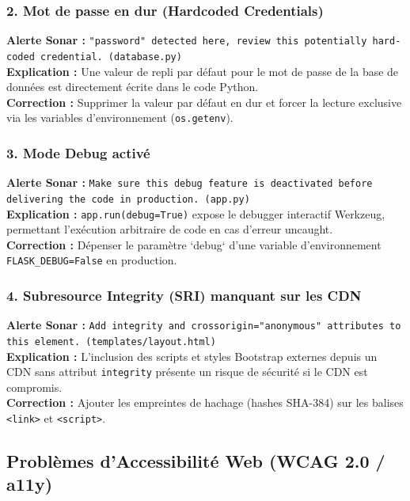 \documentclass[12pt,a4paper]{article}
\begin{document}
\subsubsection{2. Mot de passe en dur (Hardcoded Credentials)}
\textbf{Alerte Sonar :} \texttt{"password" detected here, review this potentially hard-coded credential. (database.py)}\\
\textbf{Explication :} Une valeur de repli par défaut pour le mot de passe de la base de données est directement écrite dans le code Python.\\
\textbf{Correction :} Supprimer la valeur par défaut en dur et forcer la lecture exclusive via les variables d'environnement (\texttt{os.getenv}).

\subsubsection{3. Mode Debug activé}
\textbf{Alerte Sonar :} \texttt{Make sure this debug feature is deactivated before delivering the code in production. (app.py)}\\
\textbf{Explication :} \texttt{app.run(debug=True)} expose le debugger interactif Werkzeug, permettant l'exécution arbitraire de code en cas d'erreur uncaught.\\
\textbf{Correction :} Dépenser le paramètre `debug` d'une variable d'environnement \texttt{FLASK_DEBUG=False} en production.

\subsubsection{4. Subresource Integrity (SRI) manquant sur les CDN}
\textbf{Alerte Sonar :} \texttt{Add integrity and crossorigin="anonymous" attributes to this element. (templates/layout.html)}\\
\textbf{Explication :} L'inclusion des scripts et styles Bootstrap externes depuis un CDN sans attribut \texttt{integrity} présente un risque de sécurité si le CDN est compromis.\\
\textbf{Correction :} Ajouter les empreintes de hachage (hashes SHA-384) sur les balises \texttt{<link>} et \texttt{<script>}.

\subsection{Problèmes d'Accessibilité Web (WCAG 2.0 / a11y)}
\end{document}
